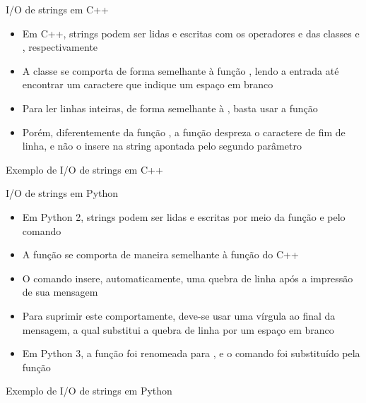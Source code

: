 \begin{frame}[fragile]{I/O de strings em C++}

    \begin{itemize}
        \item Em C++, strings podem ser lidas e escritas com os operadores  e
             das classes  e , respectivamente
        \pause

        \item A classe  se comporta de forma semelhante à função , 
            lendo a entrada até encontrar um caractere que indique um espaço em branco
        \pause

        \item Para ler linhas inteiras, de forma semelhante à , basta usar a 
            função 
        \pause

        \item Porém, diferentemente da função , a função  
            despreza o caractere de fim de linha, e não o insere na string apontada pelo segundo 
            parâmetro
    \end{itemize}

\end{frame}

\begin{frame}[fragile]{Exemplo de I/O de strings em C++}
\end{frame}

\begin{frame}[fragile]{I/O de strings em Python}

    \begin{itemize}
        \item Em Python 2, strings podem ser lidas e escritas por meio da função
             e pelo comando 
        \pause

        \item A função  se comporta de maneira semelhante à função
             do C++
        \pause

        \item O comando  insere, automaticamente, uma quebra de linha após
            a impressão de sua mensagem
        \pause

        \item Para suprimir este comportamente, deve-se usar uma vírgula ao final da mensagem,
            a qual substitui a quebra de linha por um espaço em branco
        \pause

        \item Em Python 3, a função  foi renomeada para ,
            e o comando  foi substituído pela função 
    \end{itemize} 

\end{frame}

\begin{frame}[fragile]{Exemplo de I/O de strings em Python}
\end{frame}
